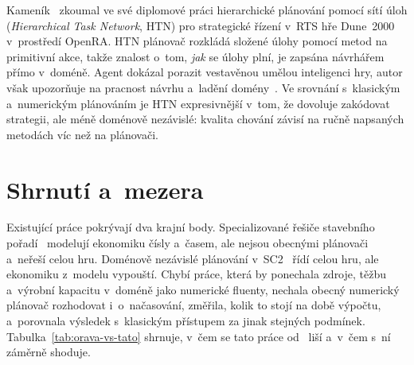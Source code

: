 Kameník~\cite{Kamenik2023} zkoumal ve své diplomové práci hierarchické plánování pomocí sítí úloh (\emph{Hierarchical Task Network}, HTN) pro strategické řízení v~RTS hře Dune~2000 v~prostředí OpenRA. HTN plánovač rozkládá složené úlohy pomocí metod na primitivní akce, takže znalost o~tom, \emph{jak} se úlohy plní, je zapsána návrhářem přímo v~doméně. Agent dokázal porazit vestavěnou umělou inteligenci hry, autor však upozorňuje na pracnost návrhu a~ladění domény~\cite{Kamenik2023}. Ve srovnání s~klasickým a~numerickým plánováním je HTN expresivnější v~tom, že dovoluje zakódovat strategii, ale méně doménově nezávislé: kvalita chování závisí na ručně napsaných metodách víc než na plánovači.

\section{Shrnutí a~mezera}
\label{sec:mezera}

Existující práce pokrývají dva krajní body. Specializované řešiče stavebního pořadí~\cite{ChurchillBuro2011} modelují ekonomiku čísly a~časem, ale nejsou obecnými plánovači a~neřeší celou hru. Doménově nezávislé plánování v~SC2~\cite{Orava2025} řídí celou hru, ale ekonomiku z~modelu vypouští. Chybí práce, která by ponechala zdroje, těžbu a~výrobní kapacitu v~doméně jako numerické fluenty, nechala obecný numerický plánovač rozhodovat i~o~načasování, změřila, kolik to stojí na době výpočtu, a~porovnala výsledek s~klasickým přístupem za jinak stejných podmínek. Tabulka~\ref{tab:orava-vs-tato} shrnuje, v~čem se tato práce od~\cite{Orava2025} liší a~v~čem s~ní záměrně shoduje.

